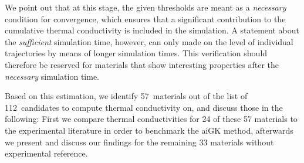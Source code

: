 %
We point out that at this stage, the given thresholds are meant as a \emph{necessary} condition for convergence, which ensures that a significant contribution to the cumulative thermal conductivity is included in the simulation. A statement about the \emph{sufficient} simulation time, however, can only made on the level of individual trajectories by means of longer simulation times. This verification should therefore be reserved for materials that show interesting properties after the \emph{necessary} simulation time.

Based on this estimation, we identify 57~materials out of the list of 112~candidates to compute thermal conductivity on, and discuss those in the following: First we compare thermal conductivities for 24 of these 57 materials to the experimental literature in order to benchmark the aiGK method, afterwards we present and discuss our findings for the remaining 33 materials without experimental reference.


